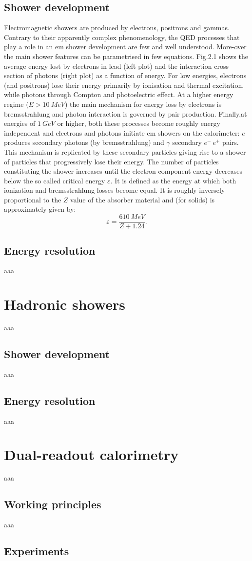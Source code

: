 \subsection{Shower development}
Electromagnetic showers are produced by electrons, positrons and gammas.
Contrary to their apparently complex phenomenology, the QED processes that play a role in an em shower development are few and well understood.
More-over the main shower features can be parametrised in few equations.
Fig.2.1 shows the average energy lost by electrons in lead (left plot) and the interaction cross section of photons (right plot) as a function of energy.
For low energies, electrons (and positrons) lose their energy primarily by ionisation and thermal excitation, while photons through Compton and photoelectric effect.
At a higher energy regime ($E > 10\ MeV$) the main mechanism for energy loss by electrons is bremsstrahlung and photon interaction is governed by pair production.
Finally,at energies of $1\ GeV$ or higher, both these processes become roughly energy independent and electrons and photons initiate em showers on the calorimeter: $e$ produces secondary photons (by bremsstrahlung) and $\gamma$ secondary $e^-\ e^+$ pairs.
This mechanism is replicated by these secondary particles giving rise to a shower of particles that progressively lose their energy.
The number of particles constituting the shower increases until the electron component energy decreases below the so called critical energy $\varepsilon$.
It is defined as the energy at which both ionization and bremsstrahlung losses become equal.
It is roughly inversely proportional to the $Z$ value of the absorber material and (for solids) is approximately given by:
\begin{equation}
	\varepsilon = \frac{610\ MeV}{Z + 1.24}.
\end{equation}

\subsection{Energy resolution}
aaa

\section{Hadronic showers}
aaa

\subsection{Shower development}
aaa

\subsection{Energy resolution}
aaa

\section{Dual-readout calorimetry}
aaa

\subsection{Working principles}
aaa

\subsection{Experiments}